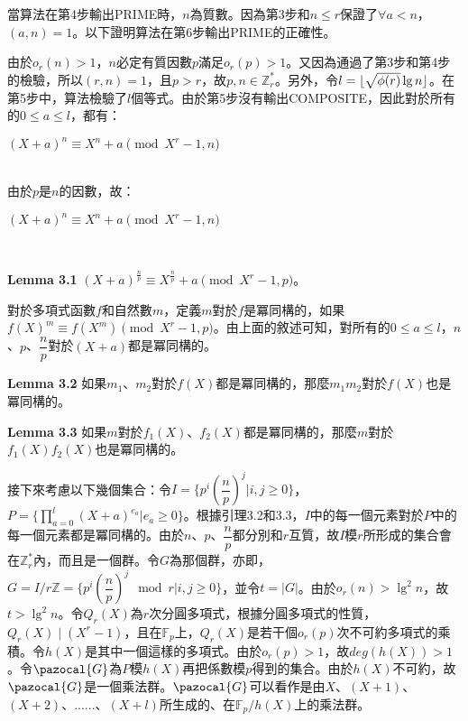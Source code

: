\documentclass{article}
\DeclarePairedDelimiter\floor{\lfloor}{\rfloor}
\newcommand{\Gc}{\pazocal{G}}
\begin{document}
    當算法在第4步輸出PRIME時，$n$為質數。因為第3步和$n\leq r$保證了$\forall a<n$，$(a,n)=1$。以下證明算法在第6步輸出PRIME的正確性。

    由於$o_r(n)>1$，$n$必定有質因數$p$滿足$o_r(p)>1$。又因為通過了第3步和第4步的檢驗，所以$(r,n)=1$，且$p>r$，故$p,n\in \mathbb{Z}_r^*$。另外，令$l=\floor{\sqrt{\phi(r)}\lg n}$。在第5步中，算法檢驗了$l$個等式。由於第5步沒有輸出COMPOSITE，因此對於所有的$0\leq a\leq l$，都有：\\
    \centerline{$(X+a)^n\equiv X^n+a\pmod{X^r-1, n}$}\\
由於$p$是$n$的因數，故：\\
    \centerline{$(X+a)^n\equiv X^n+a\pmod{X^r-1, n}$}\\

\begin{mdframed}
\noindent\textbf{Lemma 3.1} $(X+a)^{\frac{n}{p}}\equiv X^{\frac{n}{p}}+a\pmod{X^r-1, p}$。
\end{mdframed}

    對於多項式函數$f$和自然數$m$，定義$m$對於$f$是冪同構的，如果$f(X)^m\equiv f(X^m)\pmod{X^r-1, p}$。由上面的敘述可知，對所有的$0\leq a\leq l$，$n$、$p$、$\dfrac{n}{p}$對於$(X+a)$都是冪同構的。

\begin{mdframed}
\noindent\textbf{Lemma 3.2} 如果$m_1$、$m_2$對於$f(X)$都是冪同構的，那麼$m_1m_2$對於$f(X)$也是冪同構的。
\end{mdframed}

\begin{mdframed}
\noindent\textbf{Lemma 3.3} 如果$m$對於$f_1(X)$、$f_2(X)$都是冪同構的，那麼$m$對於$f_1(X)f_2(X)$也是冪同構的。
\end{mdframed}

    接下來考慮以下幾個集合：令$I=\{p^i(\dfrac{n}{p})^j|i, j\geq 0\}$，$P=\{\prod\limits_{a=0}^{l}(X+a)^{e_a}|e_a\geq 0\}$。根據引理3.2和3.3，$I$中的每一個元素對於$P$中的每一個元素都是冪同構的。由於$n$、$p$、$\dfrac{n}{p}$都分別和$r$互質，故$I$模$r$所形成的集合會在$\mathbb{Z}_r^*$內，而且是一個群。令$G$為那個群，亦即，$G=I/r\mathbb{Z}=\{p^i(\dfrac{n}{p})^j \mod r|i, j\geq 0\}$，並令$t=|G|$。由於$o_r(n)>\lg^2n$，故$t>\lg^2n$。令$Q_r(X)$為$r$次分圓多項式，根據分圓多項式的性質，$Q_r(X)\mid (X^r-1)$，且在$\mathbb{F}_p$上，$Q_r(X)$是若干個$o_r(p)$次不可約多項式的乘積。令$h(X)$是其中一個這樣的多項式。由於$o_r(p)>1$，故$deg(h(X))>1$。令$\Gc$為$P$模$h(X)$再把係數模$p$得到的集合。由於$h(X)$不可約，故$\Gc$是一個乘法群。$\Gc$可以看作是由$X$、$(X+1)$、$(X+2)$、......、$(X+l)$所生成的、在$\mathbb{F}_p/h(X)$上的乘法群。
\end{document}
